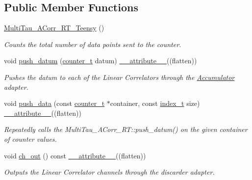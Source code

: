 \subsection*{Public Member Functions}
\begin{DoxyCompactItemize}
\item 
\hyperlink{classMultiTau__ACorr__RT__Teensy_a28cfdcd7468aac93693a4d4803fc95f9}{Multi\+Tau\+\_\+\+A\+Corr\+\_\+\+R\+T\+\_\+\+Teensy} ()
\begin{DoxyCompactList}\small\item\em Counts the total number of data points sent to the counter. \end{DoxyCompactList}\item 
void \hyperlink{classMultiTau__ACorr__RT__Teensy_a1ad6126310c987f53a0ec7ab3ae03a12}{push\+\_\+datum} (\hyperlink{types_8hpp_ac89ac912f524b3e3fa3720ea55fec966}{counter\+\_\+t} datum) \hyperlink{utilities_8hpp_a103d5b3998e0dd804213c8f30a094f4d}{\+\_\+\+\_\+attribute\+\_\+\+\_\+}((flatten))
\begin{DoxyCompactList}\small\item\em Pushes the datum to each of the Linear Correlators through the \hyperlink{classAccumulator}{Accumulator} adapter. \end{DoxyCompactList}\item 
void \hyperlink{classMultiTau__ACorr__RT__Teensy_ae36ab4fb6f646d068e638ab7e4ec9da8}{push\+\_\+data} (const \hyperlink{types_8hpp_ac89ac912f524b3e3fa3720ea55fec966}{counter\+\_\+t} $\ast$container, const \hyperlink{types_8hpp_a7c40bb931c31595ed6308605f4537447}{index\+\_\+t} size) \hyperlink{utilities_8hpp_a103d5b3998e0dd804213c8f30a094f4d}{\+\_\+\+\_\+attribute\+\_\+\+\_\+}((flatten))
\begin{DoxyCompactList}\small\item\em Repeatedly calls the Multi\+Tau\+\_\+\+A\+Corr\+\_\+\+R\+T\+::push\+\_\+datum() on the given container of counter values. \end{DoxyCompactList}\item 
void \hyperlink{classMultiTau__ACorr__RT__Teensy_a37a29725971f15305398ac7c9c360eac}{ch\+\_\+out} () const \hyperlink{utilities_8hpp_a103d5b3998e0dd804213c8f30a094f4d}{\+\_\+\+\_\+attribute\+\_\+\+\_\+}((flatten))
\begin{DoxyCompactList}\small\item\em Outputs the Linear Correlator channels through the discarder adapter. \end{DoxyCompactList}\item 

\end{DoxyCompactItemize}
